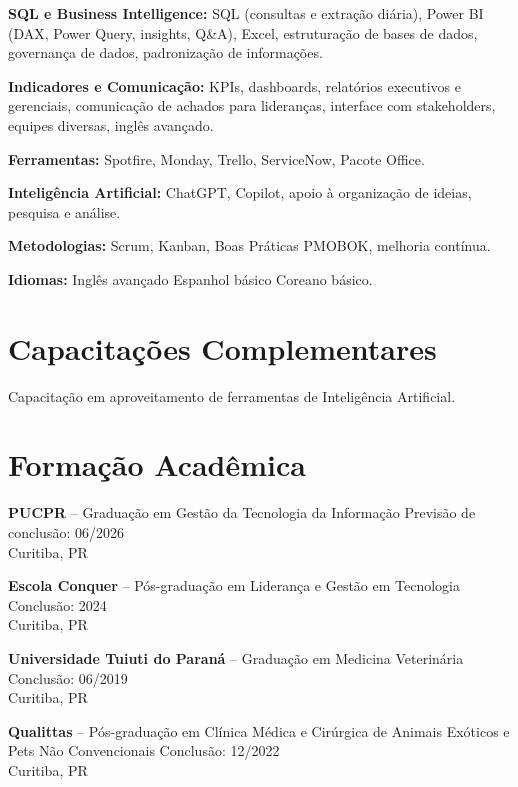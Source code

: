 \documentclass[11pt,a4paper]{article}
\begin{document}
\textbf{SQL e Business Intelligence:} SQL (consultas e extração diária), Power BI (DAX, Power Query, insights, Q\&A), Excel, estruturação de bases de dados, governança de dados, padronização de informações.

\textbf{Indicadores e Comunicação:} KPIs, dashboards, relatórios executivos e gerenciais, comunicação de achados para lideranças, interface com stakeholders, equipes diversas, inglês avançado.

\textbf{Ferramentas:} Spotfire, Monday, Trello, ServiceNow, Pacote Office.

\textbf{Inteligência Artificial:} ChatGPT, Copilot, apoio à organização de ideias, pesquisa e análise.

\textbf{Metodologias:} Scrum, Kanban, Boas Práticas PMOBOK, melhoria contínua.

\textbf{Idiomas:} Inglês avançado \textbullet{} Espanhol básico \textbullet{} Coreano básico.

\section*{Capacitações Complementares}

Capacitação em aproveitamento de ferramentas de Inteligência Artificial.

\section*{Formação Acadêmica}

\textbf{PUCPR} -- Graduação em Gestão da Tecnologia da Informação \hfill Previsão de conclusão: 06/2026\\
Curitiba, PR

\textbf{Escola Conquer} -- Pós-graduação em Liderança e Gestão em Tecnologia \hfill Conclusão: 2024\\
Curitiba, PR

\textbf{Universidade Tuiuti do Paraná} -- Graduação em Medicina Veterinária \hfill Conclusão: 06/2019\\
Curitiba, PR

\textbf{Qualittas} -- Pós-graduação em Clínica Médica e Cirúrgica de Animais Exóticos e Pets Não Convencionais \hfill Conclusão: 12/2022\\
Curitiba, PR
\end{document}
